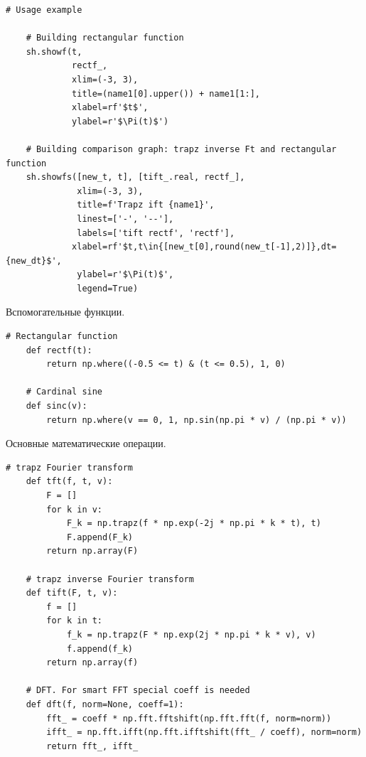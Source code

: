 \documentclass[a4paper, 12pt]{article}
\begin{document}
    \begin{lstlisting}[label=ex1, caption={Пример использования методов для построения графиков}]
    # Usage example

    # Building rectangular function
    sh.showf(t,
             rectf_,
             xlim=(-3, 3),
             title=(name1[0].upper()) + name1[1:],
             xlabel=rf'$t$',
             ylabel=r'$\Pi(t)$')

    # Building comparison graph: trapz inverse Ft and rectangular function
    sh.showfs([new_t, t], [tift_.real, rectf_],
              xlim=(-3, 3),
              title=f'Trapz ift {name1}',
              linest=['-', '--'],
              labels=['tift rectf', 'rectf'],
             xlabel=rf'$t,t\in{[new_t[0],round(new_t[-1],2)]},dt={new_dt}$',
              ylabel=r'$\Pi(t)$',
              legend=True)
    \end{lstlisting}


    Вспомогательные функции.
    \begin{lstlisting}[label=help1, caption={Методы для нахождения прямоугольной функции и кардинального синуса}]
    # Rectangular function
    def rectf(t):
        return np.where((-0.5 <= t) & (t <= 0.5), 1, 0)

    # Cardinal sine
    def sinc(v):
        return np.where(v == 0, 1, np.sin(np.pi * v) / (np.pi * v))
    \end{lstlisting}


    Основные математические операции.
    \begin{lstlisting}[label=fmath1, caption={Методы, реализующие \texttt{trapz}, \texttt{dft} и умный \texttt{fft}}]
    # trapz Fourier transform
    def tft(f, t, v):
        F = []
        for k in v:
            F_k = np.trapz(f * np.exp(-2j * np.pi * k * t), t)
            F.append(F_k)
        return np.array(F)

    # trapz inverse Fourier transform
    def tift(F, t, v):
        f = []
        for k in t:
            f_k = np.trapz(F * np.exp(2j * np.pi * k * v), v)
            f.append(f_k)
        return np.array(f)

    # DFT. For smart FFT special coeff is needed
    def dft(f, norm=None, coeff=1):
        fft_ = coeff * np.fft.fftshift(np.fft.fft(f, norm=norm))
        ifft_ = np.fft.ifft(np.fft.ifftshift(fft_ / coeff), norm=norm)
        return fft_, ifft_
    \end{lstlisting}
\end{document}
